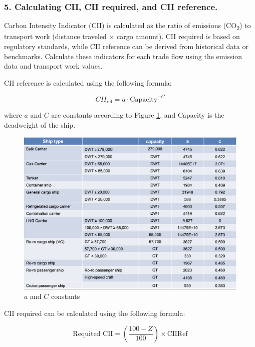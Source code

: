 \subsubsection{5. Calculating CII, CII required, and CII reference.}

Carbon Intensity Indicator (CII) is calculated as the ratio of emissions (CO\textsubscript{2}) to transport work (distance traveled $\times$ cargo amount). CII required is based on regulatory standards, while CII reference can be derived from historical data or benchmarks. Calculate these indicators for each trade flow using the emission data and transport work values.

CII reference is calculated using the following formula:

\begin{equation}
    CII_{\text{ref}} = a \cdot \text{Capacity}^{-C}
\end{equation}

where $a$ and $C$ are constants according to Figure \ref{cii_ref_constant}, and Capacity is the deadweight of the ship.

\begin{figure}[h]
    \centering
    \includegraphics[width=1\textwidth]{images/cii_ref_constant.png}
    \caption{$a$ and $C$ constants}
    \label{cii_ref_constant}
\end{figure}

CII required can be calculated using the following formula:

\begin{equation}
    \text{Requited CII} = \left( \frac{100 -Z}{100}\right) \times \text{CIIRef}
    \label{cii_required}
\end{equation}

